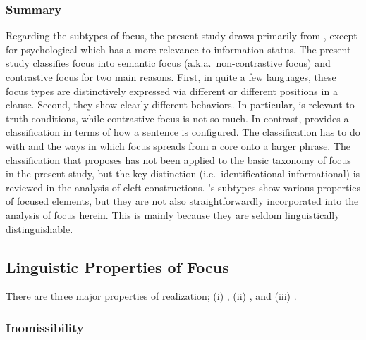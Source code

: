 \subsubsection{Summary}
\label{3:sssec:focus-sub-sum}

Regarding the subtypes of focus, the present study draws primarily
from \citet{gundel:99}, except for psychological  which has
a more relevance to information status.  The present study classifies
focus into semantic focus (a.k.a.\ non-contrastive
focus) and contrastive focus for two main
reasons.  First, in quite a few languages, these focus types are
distinctively expressed via different  or
different positions in a clause. Second, they show clearly different
behaviors. In particular,  is
relevant to truth-conditions, while contrastive focus is not so much. In contrast, \citet{lambrecht:96} provides a
classification in terms of how a sentence is configured. The
classification has to do with  and the ways in
which focus spreads from a core onto a larger phrase. The
classification that \citet{kiss:98} proposes has not been applied to
the basic taxonomy of focus in the present study, but the key
distinction (i.e.\ identificational \vs informational) is reviewed in
the analysis of cleft constructions.
\citet{gussenhoven:07}'s subtypes show various properties of focused
elements, but they are not also straightforwardly incorporated into
the analysis of focus herein. This is mainly because they are seldom
linguistically distinguishable.


\subsection{Linguistic Properties of Focus}
\label{3:ssec:properties-focus}

There are three major properties of  realization; (i)
, (ii) , and (iii)
.

\subsubsection{Inomissibility}
\label{3:sssec:inomissibility}




